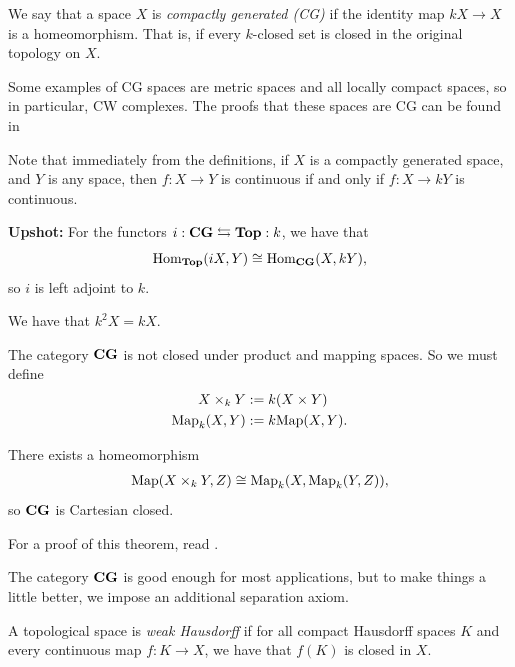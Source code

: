\documentclass{article}[11pt]
\begin{document}
\begin{definition} We say that a space $X$ is \textit{compactly generated (CG)} if the identity map $kX \to X$ is a homeomorphism. That is, if every $k$-closed set is closed in the original topology on $X$.
\end{definition}

Some examples of CG spaces are metric spaces and all locally compact spaces, so in particular, CW complexes. The proofs that these spaces are CG can be found in \cite[Propositions 1.6, 1.7]{Strickland-cgwh}


Note that immediately from the definitions, if $X$ is a compactly generated space, and $Y$ is any space, then $f: X \to Y$ is continuous if and only if $f: X \to kY$ is continuous. 

\textbf{Upshot:} For the functors $i:\textbf{CG} \leftrightarrows \textbf{Top}:k$, we have that
\[
	\textup{Hom}_{\textbf{Top}} (iX,Y) \cong \textup{Hom}_{\textbf{CG}} (X, kY),
\]
so $i$ is left adjoint to $k$.


\begin{note} We have that $k^2 X = kX$.
\end{note}

\begin{note} The category $\textbf{CG}$ is not closed under product and mapping spaces. So we must define
\begin{align*}
	X\times_k Y &:= k(X\times Y) \\
	\textup{Map}_k (X,Y) &:= k\textup{Map}(X,Y).
\end{align*}
\end{note}

\begin{theorem} There exists a homeomorphism
\begin{align*}
	\textup{Map}(X\times_k Y, Z) \cong \textup{Map}_k (X, \textup{Map}_k (Y,Z)),
\end{align*}
so $\textbf{CG}$ is Cartesian closed.
\end{theorem}

For a proof of this theorem, read \cite[Proposition 2.11]{Strickland-cgwh}.

The category $\textbf{CG}$ is good enough for most applications, but to make things a little better, we impose an additional separation axiom.

\begin{definition} A topological space is \textit{weak Hausdorff} if for all compact Hausdorff spaces $K$ and every continuous map $f: K \to X$, we have that $f(K)$ is closed in $X$.
\end{definition}
\end{document}
